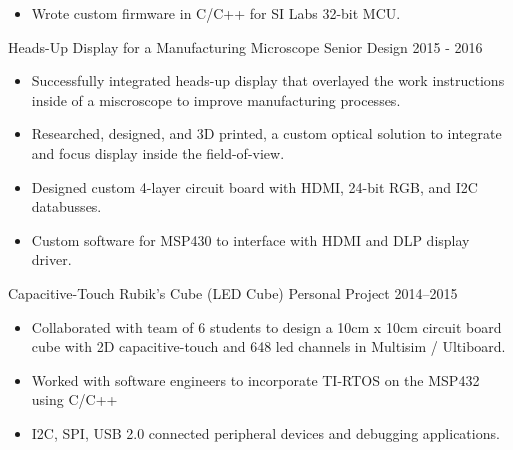 \documentclass[]{bergman-cv} %
\begin{document}
\begin{entrylist}
{\begin{itemize}
	\item Wrote custom firmware in C/C++ for SI Labs 32-bit MCU.
\end{itemize}}
\vspace{16pt}
\entryFourItem
{Heads-Up Display for a Manufacturing Microscope}
{Senior Design}
{2015 - 2016}
{\begin{itemize}	\setlength\itemsep{0.25em} \vspace*{-5pt}
	\item Successfully integrated heads-up display that overlayed the work instructions inside of a miscroscope to improve manufacturing processes.
	\item Researched, designed, and 3D printed, a custom optical solution to integrate and focus display inside the field-of-view.
	\item Designed custom 4-layer circuit board with HDMI, 24-bit RGB, and I2C databusses.
	\item Custom software for MSP430 to interface with HDMI and DLP display driver.
\end{itemize}}
\vspace{10pt}
\entryFourItem
{Capacitive-Touch Rubik's Cube (LED Cube)}
{Personal Project}
{2014--2015}
{\begin{itemize}	\setlength\itemsep{0.25em} \vspace*{-5pt}
	\item Collaborated with team of 6 students to design a 10cm x 10cm circuit board cube with 2D capacitive-touch and 648 led channels in Multisim / Ultiboard.
	\item Worked with software engineers to incorporate TI-RTOS on the MSP432 using C/C++
	\item I2C, SPI, USB 2.0 connected peripheral devices and debugging applications.


\end{itemize}}
\end{entrylist}
\end{document}
